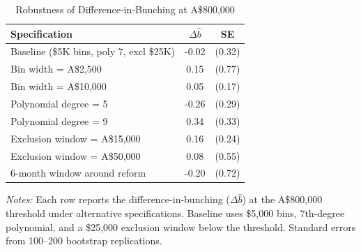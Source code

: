 \begin{table}[t]
\centering
\caption{Robustness of Difference-in-Bunching at A\$800,000}
\label{tab:robustness}
\begin{tabular}{lcc}
\hline\hline
Specification & $\Delta\hat{b}$ & SE \\
\hline
Baseline (\$5K bins, poly 7, excl \$25K) & -0.02 & (0.32) \\
Bin width = A\$2,500 & 0.15 & (0.77) \\
Bin width = A\$10,000 & 0.05 & (0.17) \\
Polynomial degree = 5 & -0.26 & (0.29) \\
Polynomial degree = 9 & 0.34 & (0.33) \\
Exclusion window = A\$15,000 & 0.16 & (0.24) \\
Exclusion window = A\$50,000 & 0.08 & (0.55) \\
6-month window around reform & -0.20 & (0.72) \\
\hline\hline
\end{tabular}
\begin{tablenotes}[flushleft]\small
\item \textit{Notes:} Each row reports the difference-in-bunching ($\Delta\hat{b}$) at the A\$800,000 threshold under alternative specifications. Baseline uses \$5,000 bins, 7th-degree polynomial, and a \$25,000 exclusion window below the threshold. Standard errors from 100--200 bootstrap replications.
\end{tablenotes}
\end{table}


